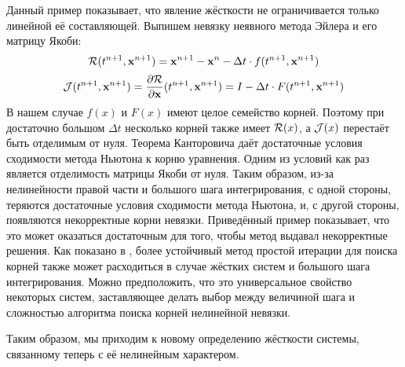 Данный пример показывает, что явление жёсткости не ограничивается только линейной её составляющей.
Выпишем невязку неявного метода Эйлера и его матрицу Якоби:
%
\begin{equation}
    \label{eq:implicit_Euler_residual}
    \mathcal{R}(t^{n+1}, \mathbf{x}^{n+1}) = \mathbf{x}^{n+1} - \mathbf{x}^n - \Delta t \cdot f(t^{n+1}, \mathbf{x}^{n+1})
\end{equation}
%
\begin{equation}
    \label{eq:implicit_Euler_jacobian}
    \mathcal{J}(t^{n+1}, \mathbf{x}^{n+1}) = \frac{\partial \mathcal{R}}{\partial \mathbf{x}}(t^{n+1}, \mathbf{x}^{n+1}) = I - \Delta t \cdot F(t^{n+1}, \mathbf{x}^{n+1})
\end{equation}
%
В нашем случае $ f(x) $ и $ F(x) $ имеют целое семейство корней.
Поэтому при достаточно большом $ \Delta t $ несколько корней также имеет $ \mathcal{R}(x) $,
а $ \mathcal{J}(x) $ перестаёт быть отделимым от нуля.
Теорема Канторовича \cite{kantorovich1949method,ortega2000iterative} даёт достаточные условия сходимости метода Ньютона к корню уравнения.
Одним из условий как раз является отделимость матрицы Якоби от нуля.
Таким образом, из-за нелинейности правой части и большого шага интегрирования, с одной стороны,
теряются достаточные условия сходимости метода Ньютона, и, с другой стороны, появляются некорректные корни невязки.
Приведённый пример показывает, что это может оказаться достаточным для того, чтобы метод выдавал некорректные решения.
Как показано в \cite{lambert1991methods}, более устойчивый метод простой итерации для поиска корней
также может расходиться в случае жёстких систем и большого шага интегрирования.
Можно предположить, что это универсальное свойство некоторых систем,
заставляющее делать выбор между величиной шага и сложностью алгоритма поиска корней нелинейной невязки.

Таким образом, мы приходим к новому определению жёсткости системы,
связанному теперь с её нелинейным характером.

